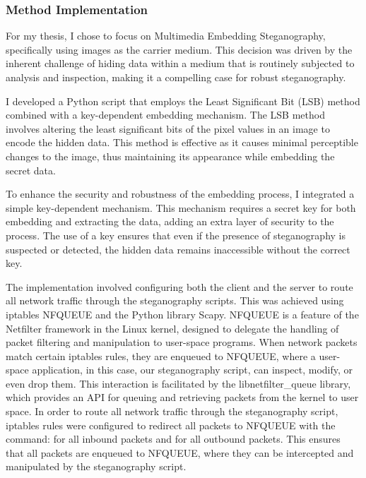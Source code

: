 \documentclass[12pt, fleqn, a4paper]{article}
\begin{document}
\subsubsection{Method Implementation}
For my thesis, I chose to focus on Multimedia Embedding Steganography, specifically using images as the carrier medium. This decision was driven by the inherent challenge of hiding data within a medium that is routinely subjected to analysis and inspection, making it a compelling case for robust steganography.

I developed a Python script that employs the Least Significant Bit (LSB) method combined with a key-dependent embedding mechanism. The LSB method involves altering the least significant bits of the pixel values in an image to encode the hidden data. This method is effective as it causes minimal perceptible changes to the image, thus maintaining its appearance while embedding the secret data.

To enhance the security and robustness of the embedding process, I integrated a simple key-dependent mechanism. This mechanism requires a secret key for both embedding and extracting the data, adding an extra layer of security to the process. The use of a key ensures that even if the presence of steganography is suspected or detected, the hidden data remains inaccessible without the correct key.

The implementation involved configuring both the client and the server to route all network traffic through the steganography scripts. This was achieved using iptables NFQUEUE and the Python library Scapy. NFQUEUE is a feature of the Netfilter framework in the Linux kernel, designed to delegate the handling of packet filtering and manipulation to user-space programs. When network packets match certain iptables rules, they are enqueued to NFQUEUE, where a user-space application, in this case, our steganography script, can inspect, modify, or even drop them. This interaction is facilitated by the libnetfilter\_queue library, which provides an API for queuing and retrieving packets from the kernel to user space. In order to route all network traffic through the steganography script, iptables rules were configured to redirect all packets to NFQUEUE with the command:  for all inbound packets and  for all outbound packets. This ensures that all packets are enqueued to NFQUEUE, where they can be intercepted and manipulated by the steganography script.
\end{document}
